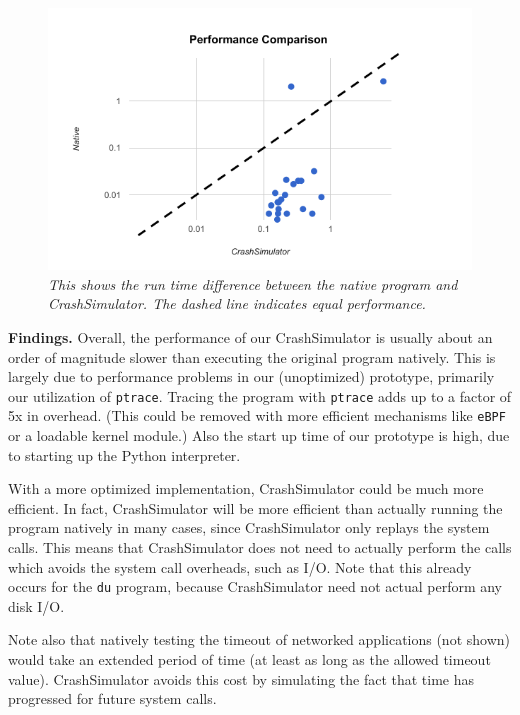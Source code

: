     \begin{figure}[t]
        \center{}
        \includegraphics[scale=.5]{performance.png}
        \caption{\emph{This shows the run time difference between the
native program and CrashSimulator. The dashed line indicates equal
performance. }}

    \end{figure}


{\bf Findings.}
Overall, the performance of our CrashSimulator is usually about an order of
magnitude slower than executing the original program natively.  This is 
largely due to performance problems in our (unoptimized) prototype, 
primarily our utilization of {\tt ptrace}.  Tracing the program
with {\tt ptrace} adds up to a factor of 5x in overhead.  (This could
be removed with more efficient mechanisms like {\tt eBPF} or a loadable 
kernel module.)  Also the start up time of our prototype is high, due
to starting up the Python interpreter.


With a more optimized implementation, CrashSimulator could be much more 
efficient.  In fact, CrashSimulator will be more efficient than actually
running the program natively in many cases, since CrashSimulator only
replays the system calls.  This means that CrashSimulator does not need to
actually perform the calls which avoids the system call overheads, such as 
I/O.  Note that this already occurs for the {\tt du} program, because 
CrashSimulator need not actual perform any disk I/O.

Note also that natively testing the timeout of networked applications (not
shown) would take an extended period of time (at least as long as the allowed
timeout value).  CrashSimulator avoids this cost by simulating the fact that
time has progressed for future system calls.


